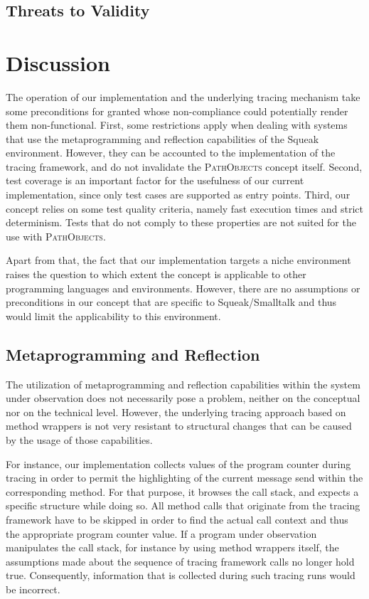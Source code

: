 \subsection{Threats to Validity}
\label{ss:DiscussionEvaluationThreats}

\clearpage
\section{Discussion}
\label{s:DiscussionLimitations}
The operation of our implementation and the underlying tracing mechanism take some preconditions for granted whose non-compliance could potentially render them non-functional.
First, some restrictions apply when dealing with systems that use the metaprogramming and reflection capabilities of the Squeak environment.
However, they can be accounted to the implementation of the tracing framework, and do not invalidate the \textsc{PathObjects} concept itself.
Second, test coverage is an important factor for the usefulness of our current implementation, since only test cases are supported as entry points. 
Third, our concept relies on some test quality criteria, namely fast execution times and strict determinism.
Tests that do not comply to these properties are not suited for the use with \textsc{PathObjects}.

Apart from that, the fact that our implementation targets a niche environment raises the question to which extent the concept is applicable to other programming languages and environments.
However, there are no assumptions or preconditions in our concept that are specific to  Squeak/Smalltalk and thus would limit the applicability to this environment.

\subsection{Metaprogramming and Reflection}
\label{ss:DiscussionLimitationsMeta}
The utilization of metaprogramming and reflection capabilities within the system under observation does not necessarily pose a problem, neither on the conceptual nor on the technical level.
However, the underlying tracing approach based on method wrappers is not very resistant to structural changes that can be caused by the usage of those capabilities.

For instance, our implementation collects values of the program counter during tracing in order to permit the highlighting of the current message send within the corresponding method.
For that purpose, it browses the call stack, and expects a specific structure while doing so.
All method calls that originate from the tracing framework have to be skipped in order to find the actual call context and thus the appropriate program counter value.
If a program under observation manipulates the call stack, for instance by using method wrappers itself, the assumptions made about the sequence of tracing framework calls no longer hold true.
Consequently, information that is collected during such tracing runs would be incorrect.

